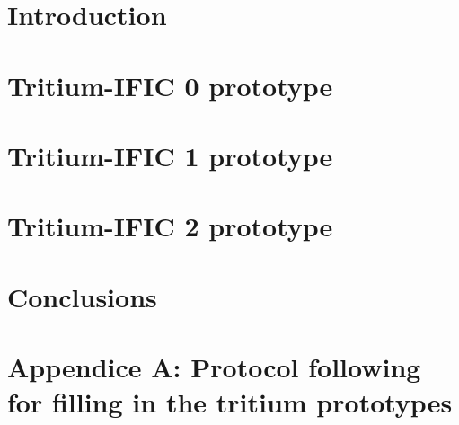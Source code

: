 \documentclass[11pt,a4paper]{article}
\begin{document}



\tableofcontents
\newpage


\section{Introduction}  \label{sec:Introduction}


\section{Tritium-IFIC 0 prototype} \label{sec:TritiumIFIC0}


\section{Tritium-IFIC 1 prototype} \label{sec:TritiumIFIC1}


\section{Tritium-IFIC 2 prototype} \label{sec:TritiumIFIC2}


\section{Conclusions} \label{sec:Conclusions}


\section{Appendice A: Protocol following for filling in the tritium prototypes} \label{sec:FillInPrototypes}

\end{document}
